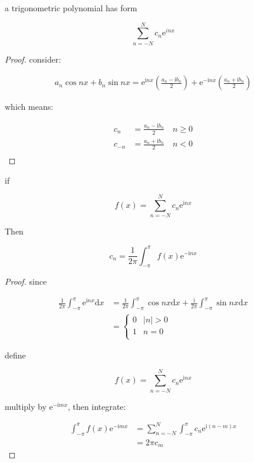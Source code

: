 \begin{thm}
    a trigonometric polynomial has form

    \[
        \sum_{n=-N}^{N} c_n \mathrm{e}^{inx}
    \]
\end{thm}

\begin{proof}
   consider:
   
   \begin{align}
        a_n \cos nx + b_n \sin n x = \mathrm{e}^{\mathrm{i} nx} \left( \frac{a_n - \mathrm{i}b_n}{2} \right) + \mathrm{e}^{-\mathrm{i} nx} \left( \frac{a_n + \mathrm{i}b_n}{2} \right)
   \end{align}

   which means:

   \begin{align*}
        c_n &= \frac{a_n - \mathrm{i}b_n}{2} \quad n \ge 0 \\
        c_{-n} &= \frac{a_n + \mathrm{i}b_n}{2}  \quad n < 0 \\
   \end{align*}


\end{proof}

\begin{thm}
    if 

    \[
        f(x) = \sum_{n=-N}^{N} c_n \mathrm{e}^{\mathrm{i} nx}
    \]

    Then

    \[
        c_n = \frac{1}{2 \pi} \int_{-\pi}^{\pi}f(x) \mathrm{e}^{-\mathrm{i}nx}
    \]
\end{thm}

\begin{proof}
    since
    
   \begin{align*}
    \frac{1}{2 \pi} \int_{- \pi}^{\pi} \mathrm{e}^{\mathrm{i} nx} \mathrm{d}x &= \frac{1}{2 \pi} \int_{- \pi}^{\pi} \cos nx \mathrm{d}x + \frac{\mathrm{i}}{2 \pi} \int_{- \pi}^{\pi} \sin nx \mathrm{d}x \\
    &= \begin{cases}
        0 & |n| > 0\\
        1 & n = 0 \\
    \end{cases}
   \end{align*}

   define

   \[
        f(x) = \sum_{n=-N}^{N} c_n \mathrm{e}^{\mathrm{i} nx}
   \] 

   multiply by $\mathrm{e}^{- \mathrm{i}m x}$, then integrate:

   \begin{align*}
    \int_{-\pi}^{\pi}f(x)\mathrm{e}^{- \mathrm{i} mx} &= \sum_{n=-N}^{N} \int_{-\pi}^{\pi} c_n \mathrm{e}^{\mathrm{i} (n-m)x}  \\
    &=  2\pi c_m
   \end{align*}
\end{proof}


